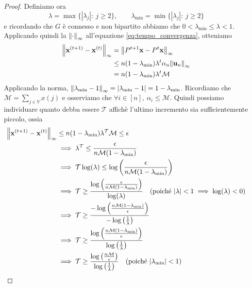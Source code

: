\begin{teorema}
\begin{proof}
        Definiamo ora 
        \[
            \lambda = \max \{ |\lambda_j|:\ j \geq 2 \}, \qquad \lambda_{\min} = \min \{ |\lambda_j|:\ j \geq 2 \}
        \]
        e ricordando che $G$ è connesso e non bipartito abbiamo che $0 < \lambda_{\min} \leq \lambda < 1$. Applicando quindi la $\norm{\cdot}_{\infty}$ all'equazione \autoref{eq:tempo_convergenza}, otteniamo
        \begin{align*}
            \norm{\mathbf{x}^{(t+1)} - \mathbf{x}^{(t)}}_{\infty} 
            &= \norm{P^{t+1}\mathbf{x} - P^t\mathbf{x}}_{\infty} \\
            &\leq n(1 - \lambda_{\min})\lambda^t\alpha_n\norm{\mathbf{u}_n}_{\infty} \\
            &= n(1 - \lambda_{\min})\lambda^t\mathcal{M}
        \end{align*}
        Applicando la norma, $\norm{\lambda_{\min} - 1}_{\infty} = |\lambda_{\min} - 1| = 1 - \lambda_{\min}$. Ricordiamo che $\mathcal{M} = \sum_{j \in V} x(j)$ e osserviamo che $\forall i \in [n],\ \alpha_i \leq \mathcal{M}$. Quindi possiamo individuare quanto debba essere $\mathcal{T}$ affichè l'ultimo incremento sia sufficientemente piccolo, ossia
        \begin{align*}
            \norm{\mathbf{x}^{(t+1)} - \mathbf{x}^{(t)}}_{\infty} 
            &\leq n(1 - \lambda_{\min})\lambda^\mathcal{T}\mathcal{M} \leq \epsilon \\
            &\implies \lambda^\mathcal{T} \leq \frac{\epsilon}{n\mathcal{M}(1 - \lambda_{\min})} \\
            &\implies \mathcal{T} \log(\lambda) \leq \log\left(\frac{\epsilon}{n\mathcal{M}(1 - \lambda_{\min})}\right) \\
            &\implies \mathcal{T} \geq \frac{\log\left(\frac{\epsilon}{n\mathcal{M}(1 - \lambda_{\min})}\right)}{\log(\lambda)} \quad \text{(poiché } |\lambda| < 1 \implies \log(\lambda) < 0 \text{)} \\
            &\implies \mathcal{T} \geq \frac{-\log\left(\frac{n\mathcal{M}(1 - \lambda_{\min})}{\epsilon}\right)}{-\log\left(\frac{1}{\lambda}\right)} \\
            &\implies \mathcal{T} \geq \frac{\log\left(\frac{n\mathcal{M}(1 - \lambda_{\min})}{\epsilon}\right)}{\log\left(\frac{1}{\lambda}\right)} \\
            &\implies \mathcal{T} \geq \frac{\log\left(\frac{n\mathcal{M}}{\epsilon}\right)}{\log\left(\frac{1}{\lambda}\right)} \quad \text{(poiché } |\lambda_{\min}| < 1 \text{)} \\ 
        \end{align*}
    \end{proof}
\end{teorema}

